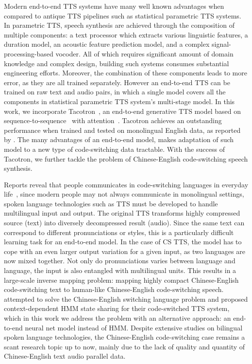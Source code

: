 \documentclass{article} %
\begin{document}
\begin{CJK}{UTF8}{bsmi}
Modern end-to-end TTS systems have many well known advantages when compared to antique TTS pipelines such as statistical parametric TTS systems. In parametric TTS, speech synthesis are achieved through the composition of multiple components: a text processor which extracts various linguistic features, a duration model, an acoustic feature prediction model, and a complex signal-processing-based vocoder. All of which requires significant amount of domain knowledge and complex design, building such systems consumes substantial engineering efforts. Moreover, the combination of these components leads to more error, as they are all trained separately. However an end-to-end TTS can be trained on raw text and audio pairs, in which a single model covers all the components in statistical parametric TTS system's multi-stage model. In this work, we incorporate Tacotron~\citep{Wang2017}, an end-to-end generative TTS model based on sequence-to-sequence~\citep{Sutskever2014} with attention~\citep{Bahdanau2014}. Tacotron achieves an outstanding performance when trained and tested on monolingual English data, as reported by \citet{Wang2017}. The many advantages of an end-to-end model, makes adaptation of such model to a new type of code-switching data tractable. With the success of Tacotron, we further tackle the problem of Chinese-English code-switching speech synthesis.

Reports reveal that people communicates in code-switching languages in everyday life~\citep{Nakayama12018}, since modern people may not always communicate in monolingual settings, spoken language technologies such as TTS must be developed to handle multilingual input and output. The original TTS transforms highly compressed source (text) into diversely decompressed result (audio). Since the same text can correspond to different pronunciations or styles, this is a particularly difficult learning task for an end-to-end model. In the case of CS TTS, the model has to cope with an even larger output variation for a given input, as two languages are now mixed together. Not only do pronunciations varies between language and language, the input is also entangled with multilingual units. This results in a large-scale inverse mapping problem: mapping highly compact Chinese-English code-switching text to human-like Chinese-English code-switching speech. \citet{Liang2007} attempted to solve the Chinese-English switching language problem and proposed context-dependent HMM state sharing for their code-switched TTS system, which in this work we address the problem with an alternative approach: an end-to-end neural net model instead of HMM. Despite extensive studies on bilingual spoken language technologies, the Chinese-English code-switching case remains a scant research topic up to now, mainly due to the lack of quality and quantity of Chinese-English text audio parallel data.


\end{CJK}
\end{document}
